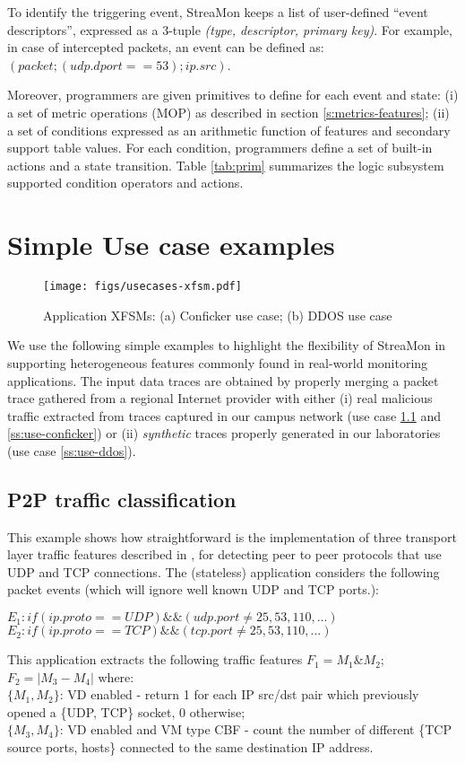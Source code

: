 \documentclass[conference,letterpaper]{sig-alternate-10pt}
\begin{document}
To identify the triggering event, StreaMon keeps a list of user-defined ``event descriptors'', expressed as a 3-tuple \textit{(type, descriptor, primary key)}. For example, in case of intercepted packets, an event can be defined as: $(packet; (udp.dport==53); ip.src)$.

Moreover, programmers are given primitives to define for each event and state: (i) a set of metric operations (MOP) as described in section \ref{s:metrics-features}; (ii) a set of conditions expressed as an arithmetic function of features and secondary support table values. For each condition, programmers define a set of built-in actions and a state transition. Table \ref{tab:prim} summarizes the logic subsystem supported condition operators and actions.

\section{Simple Use case examples}
\label{ss:usecases} 

\begin{figure*}[t]
	\centering
	\texttt{[image: figs/usecases-xfsm.pdf]}
	\caption{Application XFSMs: (a) Conficker use case; (b) DDOS use case}
	\label{fig:xfsms}
\end{figure*}

We use the following simple examples to highlight the flexibility of StreaMon in supporting heterogeneous features commonly found in real-world monitoring applications. The input data traces are obtained by properly merging a packet trace gathered from a regional Internet provider with either (i) real malicious traffic extracted from traces captured in our campus network (use case \ref{ss:use-p2p} and \ref{ss:use-conficker}) or (ii) \emph{synthetic} traces properly generated in our laboratories (use case \ref{ss:use-ddos}). 

\subsection{P2P traffic classification}
\label{ss:use-p2p}
This example shows how straightforward is the implementation of three transport layer traffic features described in \cite{kar04}, for detecting peer to peer protocols that use UDP and TCP connections. The (stateless) application considers the following packet events (which will ignore well known UDP and TCP ports.):\\
\begin{footnotesize}
$E_1: if(ip.proto==UDP)\&\&(udp.port \neq 25, 53, 110, ...)$ \\
$E_2: if(ip.proto==TCP)\&\&(tcp.port \neq 25, 53, 110, ...)$ \\
\end{footnotesize}
This application extracts the following traffic features $F_1=M_1 \& M_2$; $F_2=| M_3 - M_4|$ where:\\
$\{M_1, M_2\}$: VD enabled - return 1 for each IP src/dst pair which previously opened a \{UDP, TCP\} socket, 0 otherwise;\\
$\{M_3, M_4\}$: VD enabled and VM type CBF - count the number of different \{TCP source ports,  hosts\} connected to the same destination IP address.
\end{document}
